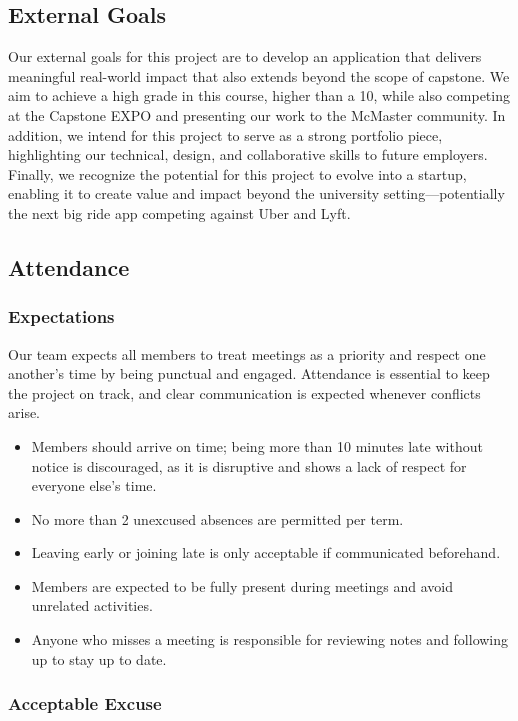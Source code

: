 \documentclass{article}
\begin{document}
\subsection*{External Goals}

Our external goals for this project are to develop an application that delivers meaningful real-world impact that also extends beyond the scope of capstone. We aim to achieve a high grade in this course, higher than a 10, while also competing at the Capstone EXPO and presenting our work to the McMaster community. In addition, we intend for this project to serve as a strong portfolio piece, highlighting our technical, design, and collaborative skills to future employers. Finally, we recognize the potential for this project to evolve into a startup, enabling it to create value and impact beyond the university setting—potentially the next big ride app competing against Uber and Lyft.

\subsection*{Attendance}

\subsubsection*{Expectations}

Our team expects all members to treat meetings as a priority and respect one another’s time by being punctual and engaged. Attendance is essential to keep the project on track, and clear communication is expected whenever conflicts arise.

\begin{itemize}
    \item Members should arrive on time; being more than 10 minutes late without notice is discouraged, as it is disruptive and shows a lack of respect for everyone else’s time.
    \item No more than 2 unexcused absences are permitted per term.
    \item Leaving early or joining late is only acceptable if communicated beforehand.
    \item Members are expected to be fully present during meetings and avoid unrelated activities.
    \item Anyone who misses a meeting is responsible for reviewing notes and following up to stay up to date.
\end{itemize}

\subsubsection*{Acceptable Excuse}
\end{document}
